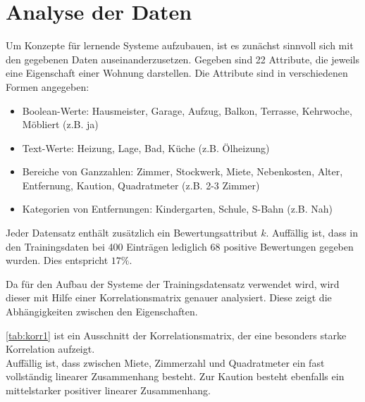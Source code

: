 \section{Analyse der Daten}\label{sec:analyse}
Um Konzepte für lernende Systeme aufzubauen, ist es zunächst sinnvoll sich mit
den gegebenen Daten auseinanderzusetzen.
Gegeben sind 22 Attribute, die jeweils eine Eigenschaft einer Wohnung darstellen.
Die Attribute sind in verschiedenen Formen angegeben:
\begin{itemize}
    \item Boolean-Werte: Hausmeister, Garage, Aufzug, Balkon, Terrasse, Kehrwoche, Möbliert (z.B. ja)
    \item Text-Werte: Heizung, Lage, Bad, Küche (z.B. Ölheizung)
    \item Bereiche von Ganzzahlen: Zimmer, Stockwerk, Miete, Nebenkosten, Alter, Entfernung, Kaution, Quadratmeter (z.B. 2-3 Zimmer)
    \item Kategorien von Entfernungen: Kindergarten, Schule, S-Bahn (z.B. Nah)
\end{itemize}

Jeder Datensatz enthält zusätzlich ein Bewertungsattribut $k$.
Auffällig ist, dass in den Trainingsdaten bei 400 Einträgen lediglich 68 positive Bewertungen gegeben wurden.
Dies entspricht $17\%$.

Da für den Aufbau der Systeme der Trainingsdatensatz verwendet wird, wird dieser mit Hilfe einer Korrelationsmatrix
genauer analysiert. Diese zeigt die Abhängigkeiten zwischen den Eigenschaften.

\autoref{tab:korr1} ist ein Ausschnitt der Korrelationsmatrix, der eine besonders starke Korrelation aufzeigt. \\
Auffällig ist, dass zwischen Miete, Zimmerzahl und Quadratmeter ein fast vollständig linearer Zusammenhang
besteht. Zur Kaution besteht ebenfalls ein mittelstarker positiver linearer Zusammenhang.

